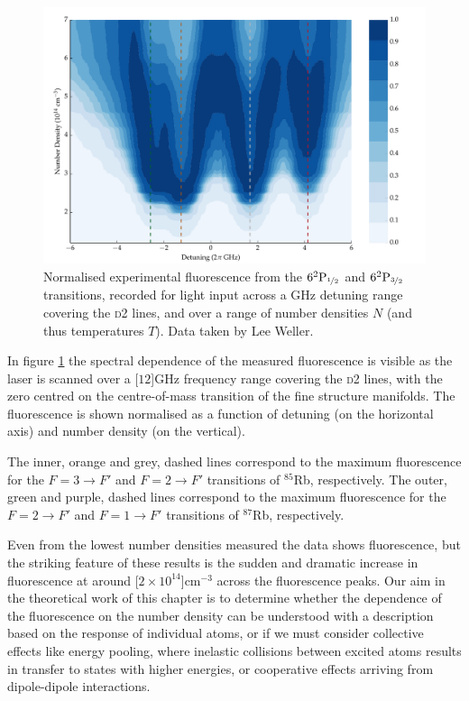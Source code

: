     \begin{figure}[]
    \includegraphics[width=\linewidth]
      {figs/05_twophoton/plot_blue_flourescence_fig1.pdf}
    \caption{
    Normalised experimental fluorescence from the
    $6^2\mathrm{P}_{\nicefrac{1}{2}}$ and $6^2\mathrm{P}_{\nicefrac{3}{2}}$
    transitions, recorded for light input across a GHz detuning range covering
    the \textsc{d2} lines, and over a range of number densities $N$ (and thus
    temperatures $T$). Data taken by Lee Weller\cite{Weller2013}.
    } 
    \label{fig:blue_flourescence} 
    \end{figure}

    In figure \ref{fig:blue_flourescence} the spectral dependence of the
    measured fluorescence is visible as the laser is scanned over a
    \unit[$12$]{GHz} frequency range covering the \textsc{d2} lines, with the
    zero centred on the centre-of-mass transition of the fine structure
    manifolds. The fluorescence is shown normalised as a function of detuning
    (on the horizontal axis) and number density (on the vertical).

    The inner, orange and grey, dashed lines correspond to the maximum
    fluorescence for the $F = 3 \rightarrow F'$ and $F = 2 \rightarrow F'$
    transitions of $^{85}$Rb, respectively. The outer, green and purple, dashed
    lines correspond to the maximum fluorescence for the $F = 2 \rightarrow F'$
    and $F = 1 \rightarrow F'$ transitions of $^{87}$Rb, respectively.

    Even from the lowest number densities measured the data shows fluorescence,
    but the striking feature of these results is the sudden and dramatic
    increase in fluorescence at around \unit[$2\times10^{14}$]{cm$^{-3}$} across
    the fluorescence peaks. Our aim in the theoretical work of this chapter is
    to determine whether the dependence of the fluorescence on the number
    density can be understood with a description based on the response of
    individual atoms, or if we must consider collective effects like energy
    pooling\cite{Bearman1978,Hill1979,Namiotka1997}, where inelastic collisions
    between excited atoms results in transfer to states with higher energies, or
    cooperative effects arriving from dipole-dipole
    interactions\cite{Keaveney2012a,Weller2011}.
